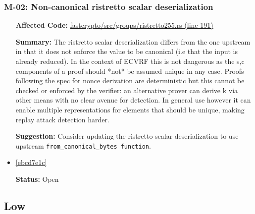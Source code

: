 \subsubsection*{M-02: Non-canonical ristretto scalar deserialization}
\begin{itemize}[align=left]
\item[\textbf{Affected Code:}] \href{https://github.com/MystenLabs/fastcrypto/blob/963205c6d0538fe548b8b10037cf87a53af6f424/fastcrypto/src/groups/ristretto255.rs#L191}{fastcrypto/src/groups/ristretto255.rs (line 191)}
\item[\textbf{Summary:}] The ristretto scalar deserialization differs from the one upstream in that it does not enforce the value to be canonical (i.e that the input is already reduced). In the context of ECVRF this is not dangerous as the s,c components of a proof should *not* be assumed unique in any case. Proofs following the spec for nonce derivation are deterministic but this cannot be checked or enforced by the verifier: an alternative prover can derive k via other means with no clear avenue for detection. In general use however it can enable multiple representations for elements that should be unique, making replay attack detection harder.
\item[\textbf{Suggestion:}] Consider updating the ristretto scalar deserialization to use upstream \lstinline{from_canonical_bytes function}.
\item[\textbf{Suggested Fix:}] \href{https://github.com/MystenLabs/fastcrypto/pull/543/commits/ebcd7e1c8e6f0bbf48667f995017151a20289886}{[ebcd7e1c]}
\item[\textbf{Status:}] Open
\end{itemize}

\subsection{Low}
